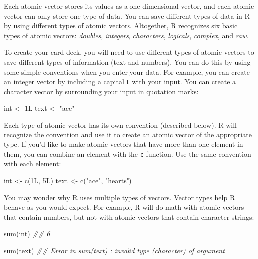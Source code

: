 \documentclass[
  letterpaper,
  DIV=11,
  numbers=noendperiod]{scrbook}
\newenvironment{Shaded}{\begin{snugshade}}{\end{snugshade}}
\newcommand{\DecValTok}[1]{\textcolor[rgb]{0.68,0.00,0.00}{#1}}
\newcommand{\DocumentationTok}[1]{\textcolor[rgb]{0.37,0.37,0.37}{\textit{#1}}}
\newcommand{\FunctionTok}[1]{\textcolor[rgb]{0.28,0.35,0.67}{#1}}
\newcommand{\NormalTok}[1]{\textcolor[rgb]{0.00,0.23,0.31}{#1}}
\newcommand{\OtherTok}[1]{\textcolor[rgb]{0.00,0.23,0.31}{#1}}
\newcommand{\StringTok}[1]{\textcolor[rgb]{0.13,0.47,0.30}{#1}}
\begin{document}
Each atomic vector stores its values as a one-dimensional vector, and
each atomic vector can only store one type of data. You can save
different types of data in R by using different types of atomic vectors.
Altogether, R recognizes six basic types of atomic vectors:
\emph{doubles}, \emph{integers}, \emph{characters}, \emph{logicals},
\emph{complex}, and \emph{raw}.

To create your card deck, you will need to use different types of atomic
vectors to save different types of information (text and numbers). You
can do this by using some simple conventions when you enter your data.
For example, you can create an integer vector by including a capital
\texttt{L} with your input. You can create a character vector by
surrounding your input in quotation marks:

\begin{Shaded}
\begin{Highlighting}[]
\NormalTok{int }\OtherTok{\textless{}{-}} \DecValTok{1}\NormalTok{L}
\NormalTok{text }\OtherTok{\textless{}{-}} \StringTok{"ace"}
\end{Highlighting}
\end{Shaded}

Each type of atomic vector has its own convention (described below). R
will recognize the convention and use it to create an atomic vector of
the appropriate type. If you'd like to make atomic vectors that have
more than one element in them, you can combine an element with the
\texttt{c} function. Use the same convention with each element:

\begin{Shaded}
\begin{Highlighting}[]
\NormalTok{int }\OtherTok{\textless{}{-}} \FunctionTok{c}\NormalTok{(}\DecValTok{1}\NormalTok{L, }\DecValTok{5}\NormalTok{L)}
\NormalTok{text }\OtherTok{\textless{}{-}} \FunctionTok{c}\NormalTok{(}\StringTok{"ace"}\NormalTok{, }\StringTok{"hearts"}\NormalTok{)}
\end{Highlighting}
\end{Shaded}

You may wonder why R uses multiple types of vectors. Vector types help R
behave as you would expect. For example, R will do math with atomic
vectors that contain numbers, but not with atomic vectors that contain
character strings:

\begin{Shaded}
\begin{Highlighting}[]
\FunctionTok{sum}\NormalTok{(int)}
\DocumentationTok{\#\# 6}

\FunctionTok{sum}\NormalTok{(text)}
\DocumentationTok{\#\# Error in sum(text) : invalid \textquotesingle{}type\textquotesingle{} (character) of argument}
\end{Highlighting}
\end{Shaded}
\end{document}
